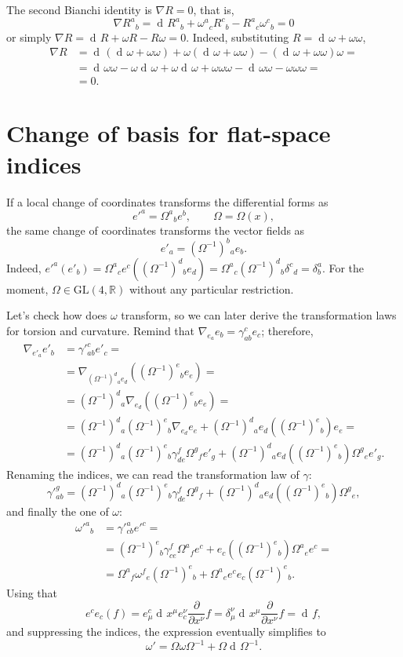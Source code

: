 \documentclass[a4paper,12pt]{book}
\newcommand{\dd}{\mathop{\mathrm{d}\!}{}}
\theoremstyle{definition}
\theoremstyle{remark}
\begin{document}
The second Bianchi identity is $\nabla R=0$, that is,
\[\nabla R^a{}_b=\dd R^a{}_b+\omega^a{}_cR^c{}_b-R^a{}_c\omega^c{}_b=0\]
or simply $\nabla R=\dd R+\omega R-R\omega=0$. Indeed, substituting $R=\dd\omega+\omega\omega$,
\begin{align*}
\nabla R&=\dd(\dd\omega+\omega\omega)+\omega(\dd\omega+\omega\omega)-(\dd\omega+\omega\omega)\omega=\\
&=\dd\omega\omega-\omega\dd\omega+\omega\dd\omega+\omega\omega\omega-\dd\omega\omega-\omega\omega\omega=\\
&=0.
\end{align*}

\section{Change of basis for flat-space indices}
If a local change of coordinates transforms the differential forms as
\[e'^a=\Omega^a{}_be^b,\qquad \Omega=\Omega(x),\]
the same change of coordinates transforms the vector fields as
\[e'_a=(\Omega^{-1})^b{}_ae_b.\]
Indeed, $e'^a(e'_b)=\Omega^a{}_ce^c((\Omega^{-1})^d{}_be_d)=\Omega^a{}_c(\Omega^{-1})^d{}_b\delta^c{}_d=\delta^a_b$. For the moment, $\Omega\in\text{GL}(4,\mathbb{R})$ without any particular restriction.

Let's check how does $\omega$ transform, so we can later derive the transformation laws for torsion and curvature. Remind that $\nabla_{e_a}e_b=\gamma_{ab}^ce_c$; therefore,
\begin{align*}
\nabla_{e'_a}e'_b&=\gamma'^c_{ab}e'_c=\\
&=\nabla_{(\Omega^{-1})^d{}_ae_d}((\Omega^{-1})^e{}_be_e)=\\
&=(\Omega^{-1})^d{}_a\nabla_{e_d}((\Omega^{-1})^e{}_be_e)=\\
&=(\Omega^{-1})^d{}_a(\Omega^{-1})^e{}_b\nabla_{e_d}e_e+(\Omega^{-1})^d{}_ae_d((\Omega^{-1})^e{}_b)e_e=\\
&=(\Omega^{-1})^d{}_a(\Omega^{-1})^e{}_b\gamma_{de}^f\Omega^g{}_fe'_g+(\Omega^{-1})^d{}_ae_d((\Omega^{-1})^e{}_b)\Omega^g{}_ee'_g.
\end{align*}
Renaming the indices, we can read the transformation law of $\gamma$:
\[\gamma'^g_{ab}=(\Omega^{-1})^d{}_a(\Omega^{-1})^e{}_b\gamma_{de}^f\Omega^g{}_f+(\Omega^{-1})^d{}_ae_d((\Omega^{-1})^e{}_b)\Omega^g{}_e,\]
and finally the one of $\omega$:
\begin{align*}
\omega'^a{}_b&=\gamma'^a_{cb}e'^c=\\
&=(\Omega^{-1})^e{}_b\gamma_{ce}^f\Omega^a{}_fe^c+e_c((\Omega^{-1})^e{}_b)\Omega^a{}_ee^c=\\
&=\Omega^a{}_f\omega^f{}_e(\Omega^{-1})^e{}_b+\Omega^a{}_ee^ce_c(\Omega^{-1})^e{}_b.
\end{align*}
Using that
\[e^ce_c(f)=e^c_\mu\dd x^\mu e^\nu_c\frac{\partial}{\partial x^\nu}f=\delta^\nu_\mu\dd x^\mu\frac{\partial}{\partial x^\nu}f=\dd f,\]
and suppressing the indices, the expression eventually simplifies to
\begin{equation}
\omega'=\Omega\omega\Omega^{-1}+\Omega\dd\Omega^{-1}.
\label{eqn:transomega}
\end{equation}
\end{document}
